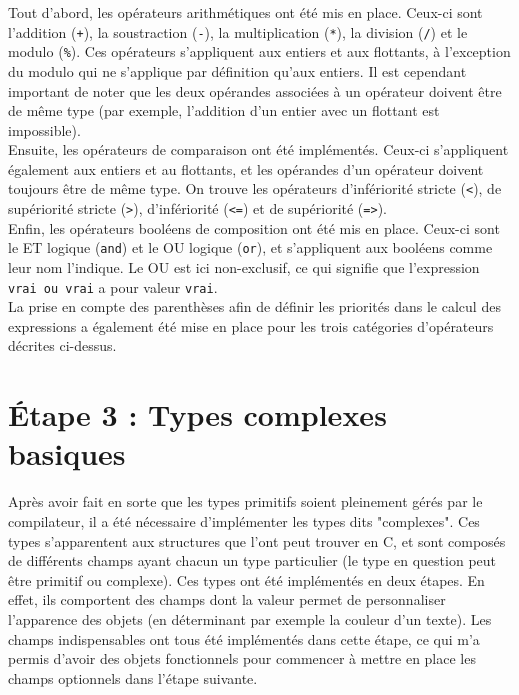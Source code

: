 \documentclass[a4paper, 12pt]{report}
\begin{document}
	Tout d'abord, les opérateurs arithmétiques ont été mis en place. Ceux-ci sont l'addition (\texttt{+}), la soustraction (\texttt{-}), la multiplication (\texttt{*}), la division (\texttt{/}) et le modulo (\texttt{\%}). Ces opérateurs s'appliquent aux entiers et aux flottants, à l'exception du modulo qui ne s'applique par définition qu'aux entiers. Il est cependant important de noter que les deux opérandes associées à un opérateur doivent être de même type (par exemple, l'addition d'un entier avec un flottant est impossible).\\

	Ensuite, les opérateurs de comparaison ont été  implémentés. Ceux-ci s'appliquent également aux entiers et au flottants, et les opérandes d'un opérateur doivent toujours être de même type. On trouve les opérateurs d'infériorité stricte (\texttt{<}), de supériorité stricte (\texttt{>}), d'infériorité (\texttt{<=}) et de supériorité (\texttt{=>}).\\
	
	Enfin, les opérateurs booléens de composition ont été mis en place. Ceux-ci sont le ET logique (\texttt{and}) et le OU logique (\texttt{or}), et s'appliquent aux booléens comme leur nom l'indique. Le OU est ici non-exclusif, ce qui signifie que l'expression \texttt{vrai ou vrai} a pour valeur \texttt{vrai}.\\
	
	La prise en compte des parenthèses afin de définir les priorités dans le calcul des expressions a également été mise en place pour les trois catégories d'opérateurs décrites ci-dessus.
    
\chapter{\'Etape 3 : Types complexes basiques}

	Après avoir fait en sorte que les types primitifs soient pleinement gérés par le compilateur, il a été nécessaire d'implémenter les types dits "complexes". Ces types s'apparentent aux structures que l'ont peut trouver en C, et sont composés de différents champs ayant chacun un type particulier (le type en question peut être primitif ou complexe). Ces types ont été implémentés en deux étapes. En effet, ils comportent des champs dont la valeur permet de personnaliser l'apparence des objets (en déterminant par exemple la couleur d'un texte). Les champs indispensables ont tous été implémentés dans cette étape, ce qui m'a permis d'avoir des objets fonctionnels pour commencer à mettre en place les champs optionnels dans l'étape suivante.\\
	
\end{document}
